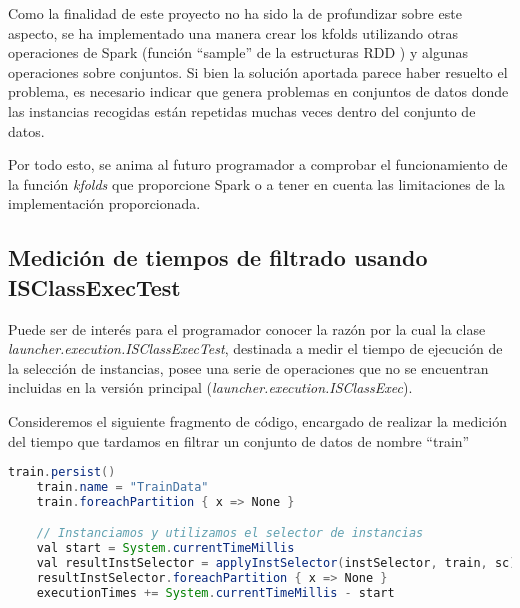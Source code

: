 Como la finalidad de este proyecto no ha sido la de profundizar sobre este aspecto, se ha implementado una manera crear los kfolds utilizando otras operaciones de Spark (función ``sample'' de la estructuras RDD ) y algunas operaciones sobre conjuntos. Si bien la solución aportada parece haber resuelto el problema, es necesario indicar que genera problemas en conjuntos de datos donde las instancias recogidas están repetidas muchas veces dentro del conjunto de datos.

Por todo esto, se anima al futuro programador a comprobar el funcionamiento de la función \textit{kfolds} que proporcione Spark o a tener en cuenta las limitaciones de la implementación proporcionada.

\subsection{Medición de tiempos de filtrado usando ISClassExecTest} \label{subsec:ISClassExecTest}

Puede ser de interés para el programador conocer la razón por la cual la clase \textit{launcher.execution.ISClassExecTest}, destinada a medir el tiempo de ejecución de la selección de instancias, posee una serie de operaciones que no se encuentran incluidas en la versión principal (\textit{launcher.execution.ISClassExec}).

Consideremos el siguiente fragmento de código, encargado de realizar la medición del tiempo que tardamos en filtrar un conjunto de datos de nombre ``train''


\begin{lstlisting}[language=Java,tabsize=4,frame = single,caption=Código de medición de tiempo de filtrado ,captionpos=b,label=lst:codigoEclipse]
    train.persist()
    train.name = "TrainData"
    train.foreachPartition { x => None }

    // Instanciamos y utilizamos el selector de instancias
    val start = System.currentTimeMillis
    val resultInstSelector = applyInstSelector(instSelector, train, sc).persist
    resultInstSelector.foreachPartition { x => None }
    executionTimes += System.currentTimeMillis - start
\end{lstlisting}

